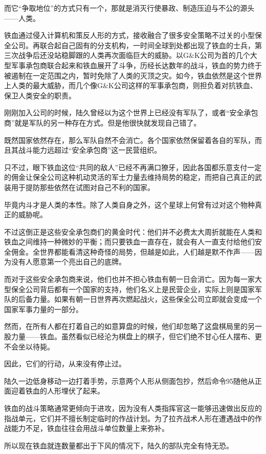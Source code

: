 而它“争取地位”的方式只有一个，那就是消灭行使暴政、制造压迫与不公的源头——人类。

铁血通过侵入计算机和策反人形的方式，接收融合了很多安全策略不过关的小型保全公司。再联合起自己固有的分支机构，一时间全球到处都出现了铁血的士兵，第三次战争后还没站稳脚跟的人类再次面临巨大的威胁。以G\&K公司为首的几个大型军事承包商联合起来和铁血展开了斗争，历经长达数年的战斗，铁血的势力终于被遏制在一定范围之内，暂时免除了人类的灭顶之灾。如今，铁血依然是这个世界上人类的最大威胁，而几个像G\&K公司这样的军事承包商，则担负着对抗铁血、保卫人类安全的职责。

刚刚加入公司的时候，陆久曾经以为这个世界上已经没有军队了，或者“安全承包商”就是军队的另一种存在方式。但是他很快就发现自己错了。

既然国家依然存在，那么军队自然不会消亡。各个国家依然保留着各自的军队，而且其战斗能力远超过“安全承包商”这一民营组织。

只不过，眼下铁血这位“共同的敌人”已经不再满口獠牙，因此各国都乐意支付一定的佣金让保全公司这种机动灵活的军士力量去维持局势的稳定，而把自己真正的武装用于提防那些依然在试图对自己不利的国家。

毕竟内斗才是人类的本性。除了人类自身之外，这个星球上何曾有过对这个物种真正的威胁呢。

不过这倒正是这些安全承包商们的黄金时代：他们并不必费太大周折就能在人类和铁血之间维持一种微妙的平衡；而只要铁血一直存在，就会有人一直支付给他们安全佣金。全世界都能看清这种奇怪的局势，但越是如此，人们越是默不作声——因为没有人愿意第一个亮出自己的底牌。

而对于这些安全承包商来说，他们也并不担心铁血有朝一日会消亡。因为每一家大型保全公司背后都有一个国家的支持，他们名义上是民营企业，实际上则是国家军队的后备力量。如果有朝一日世界再次燃起战火，这些保全公司立即就会变成一个国家军事力量的一部分。

然而，在所有人都在打着自己的如意算盘的时候，他们却忽略了这盘棋局里的另一股力量——铁血。虽然看似已经沦为棋盘上的棋子，但它们绝不甘心任人摆布、更不会坐以待毙。

因此，它们的行动，从来没有停止过。

陆久一边低身移动一边打着手势，示意两个人形从侧面包抄，然后命令95随他从正面迎着铁血的人形埋伏了起来。

铁血的战斗策略通常更倾向于进攻，因为没有人类指挥官这一能够迅速做出反应的指战单元，它们并不擅长制定临时的作战计划。为了拉齐战术人形在遭遇战中的作战能力不足，铁血往往会用战斗单位数量上来弥补。

所以现在铁血就连数量都出于下风的情况下，陆久的部队完全有恃无恐。

